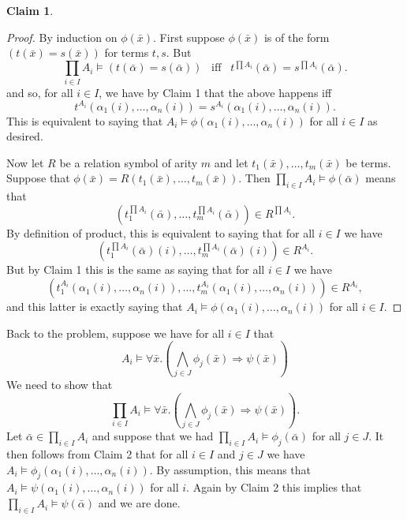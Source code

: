 \documentclass{article}
\theoremstyle{theorem}
\newtheorem{claim}{Claim}
\begin{document}
\begin{enumerate}[leftmargin=*]
\begin{claim}
		\end{claim}
		\begin{proof}
			By induction on $\phi(\bar{x})$. First suppose $\phi(\bar{x})$ is of the form $(t(\bar{x}) = s(\bar{x}))$ for terms $t,s$. But
			\begin{equation*}
				\prod_{i\in I} A_i \models (t(\bar{\alpha}) = s(\bar{\alpha})) \,\,\,\text{ iff }\,\,\, t^{\prod A_i}(\bar{\alpha}) = s^{\prod A_i}(\bar{\alpha}).
			\end{equation*}
			and so, for all $i\in I$, we have by Claim 1 that the above happens iff
			\[
				t^{A_i}(\alpha_1(i),\ldots,\alpha_n(i)) = s^{A_i}(\alpha_1(i),\ldots,\alpha_n(i)).
			\]
			This is equivalent to saying that $A_i \models \phi(\alpha_1(i),\ldots,\alpha_n(i))$ for all $i\in I$ as desired.
			
			Now let $R$ be a relation symbol of arity $m$ and let $t_1(\bar{x}),\ldots, t_m(\bar{x})$ be terms. Suppose that $\phi(\bar{x}) = R(t_1(\bar{x}),\ldots, t_m(\bar{x}))$. Then $\prod_{i\in I}A_i\models \phi(\bar{\alpha})$ means that 
			\[
				\left(t_1^{\prod A_i}(\bar{\alpha}),\ldots, t_m^{\prod A_i}(\bar{\alpha})\right) \in R^{\prod A_i}.
			\]
			By definition of product, this is equivalent to saying that for all $i\in I$ we have 
			\[
				\left(t_1^{\prod A_i}(\bar{\alpha})(i),\ldots, t_m^{\prod A_i}(\bar{\alpha})(i)\right) \in R^{A_i}.
			\]
			But by Claim 1 this is the same as saying that for all $i\in I$ we have
			\[
				\left(t_1^{A_i}(\alpha_1(i),\ldots,\alpha_n(i)), \ldots, t_m^{A_i}(\alpha_1(i),\ldots,\alpha_n(i))\right) \in R^{A_i},
			\]	
			and this latter is exactly saying that $A_i \models \phi(\alpha_1(i),\ldots,\alpha_n(i))$ for all $i\in I$.			
			\end{proof}
			Back to the problem, suppose we have for all $i \in I$ that 
			\[A_i \models \forall \bar{x}.\left(\bigwedge_{j\in J}\phi_j(\bar{x}) \Rightarrow \psi(\bar{x})\right)\]
			We need to show that 
			\[
				\prod_{i\in I}A_i \models \forall \bar{x}.\left(\bigwedge_{j\in J}\phi_j(\bar{x}) \Rightarrow \psi(\bar{x})\right).
			\]
			Let $\bar{\alpha}\in \prod_{i\in I}A_i$ and suppose that we had $\prod_{i\in I}A_i \models \phi_j(\bar{\alpha})$ for all $j\in J$. It then follows from Claim 2 that for all $i\in I$ and $j\in J$ we have $A_i\models \phi_j(\alpha_1(i),\ldots, \alpha_n(i))$. By assumption, this means that $A_i\models \psi(\alpha_1(i),\ldots, \alpha_n(i))$ for all $i$. Again by Claim 2 this implies that $\prod_{i\in I}A_i\models \psi(\bar{\alpha})$ and we are done.
			

\end{enumerate}
\end{document}
